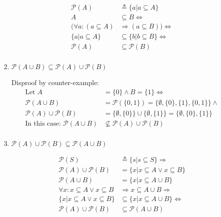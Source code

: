 \documentclass[10pt,\jkfside,a4paper]{article}
\begin{document}
\begin{enumerate}
\begin{enumerate}
\begin{equation}
\begin{split}
\mathcal{P}(A) &\triangleq \{a | a \subseteq A\} \\
A &\subseteq B \Longleftrightarrow\\
(\forall a: (a \subseteq A) &\Longrightarrow (a \subseteq B)) \Longleftrightarrow\\
\{a | a \subseteq A\} &\subseteq \{b | b \subseteq B\} \Longleftrightarrow\\
\mathcal{P}(A) &\subseteq \mathcal{P}(B)\\
\end{split}
\end{equation}

\item $\mathcal{P}(A \cup B) \subseteq \mathcal{P}(A) \cup \mathcal{P}(B)$

Disproof by counter-example:
\begin{equation}
\begin{split}
\text{Let } A &= \{0\} \wedge B = \{1\} \Longleftrightarrow\\
\mathcal{P}(A \cup B) &= \mathcal{P}(\{0, 1\}) = \{\emptyset, \{0\}, \{1\}, \{0, 1\}\} \wedge\\
\mathcal{P}(A) \cup \mathcal{P}(B) &= \{\emptyset, \{0\}\} \cup \{\emptyset, \{1\}\} = \{\emptyset, \{0\}, \{1\}\}\\
\text{In this case: } \mathcal{P}(A \cup B) &\nsubseteq \mathcal{P}(A) \cup \mathcal{P}(B)\\
\end{split}
\end{equation}

\item $\mathcal{P}(A) \cup \mathcal{P}(B) \subseteq \mathcal{P}(A \cup B)$

\begin{equation}
\begin{split}
\mathcal{P}(S) &\triangleq \{s | s \subseteq S\} \Longrightarrow\\
\mathcal{P}(A) \cup \mathcal{P}(B) &= \{x | x \subseteq A \vee x \subseteq B\}\\
\mathcal{P}(A \cup B) &= \{x | x \subseteq A \cup B\}\\
\forall x: x \subseteq A \vee x \subseteq B &\Longrightarrow x \subseteq A \cup B \Longrightarrow\\
\{x | x \subseteq A \vee x \subseteq B\} &\subseteq \{x | x \subseteq A \cup B\} \Longleftrightarrow\\
\mathcal{P}(A) \cup \mathcal{P}(B) &\subseteq \mathcal{P}(A \cup B)\\
\end{split}
\end{equation}


\end{enumerate}
\end{enumerate}
\end{document}
